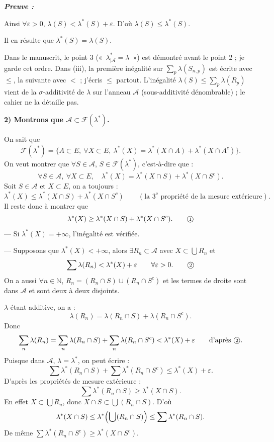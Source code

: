 \documentclass[11pt,a4paper]{article}
\newcommand{\N}{\mathbb{N}}
\newcommand{\A}{\mathscr{A}}
\newcommand{\Ff}{\mathscr{F}}
\newenvironment{preuve}{\par\textit{\textbf{Preuve :}}\par\nopagebreak[4]}{\par}
\begin{document}
\begin{preuve}
Ainsi $\forall\varepsilon>0$, $\lambda(S)<\lambda^*(S)+\varepsilon$. D'où $\lambda(S)\le\lambda^*(S)$.

Il en résulte que $\lambda^*(S)=\lambda(S)$.

\begin{note}
Dans le manuscrit, le point 3 («~$\lambda^*_{|\A}=\lambda$~») est démontré avant le point 2 ; je garde cet ordre.
Dans (iii), la première inégalité sur $\sum_p\lambda(S_{n,p})$ est écrite avec $\le$, la suivante avec $<$ ; j'écris $\le$ partout.
L'inégalité $\lambda(S)\le\sum_p\lambda(R_p)$ vient de la $\sigma$-additivité de $\lambda$ sur l'anneau $\A$ (sous-additivité dénombrable) ; le cahier ne la détaille pas.
\end{note}

\medskip
\textbf{2) Montrons que $\A\subset\Ff(\lambda^*)$.}

On sait que
\[
  \Ff(\lambda^*)=\bigl\{A\subset E,\ \forall X\subset E,\ \lambda^*(X)=\lambda^*(X\cap A)+\lambda^*(X\cap A^c)\bigr\}.
\]
On veut montrer que $\forall S\in\A$, $S\in\Ff(\lambda^*)$, c'est-à-dire que :
\[
  \forall S\in\A,\ \forall X\subset E,\quad \lambda^*(X)=\lambda^*(X\cap S)+\lambda^*(X\cap S^c).
\]
Soit $S\in\A$ et $X\subset E$, on a toujours :
\[
  \lambda^*(X)\le\lambda^*(X\cap S)+\lambda^*(X\cap S^c)\qquad(\text{la }3^{\text{e}}\text{ propriété de la mesure extérieure}).
\]
Il reste donc à montrer que
\begin{equation*}
  \lambda^*(X)\ge\lambda^*(X\cap S)+\lambda^*(X\cap S^c).\tag*{\textcircled{\scriptsize 1}}
\end{equation*}
--- Si $\lambda^*(X)=+\infty$, l'inégalité est vérifiée.

--- Supposons que $\lambda^*(X)<+\infty$, alors $\exists R_n\subset\A$ avec $X\subset\bigcup R_n$ et
\begin{equation*}
  \sum\lambda(R_n)<\lambda^*(X)+\varepsilon\qquad\forall\varepsilon>0 .\tag*{\textcircled{\scriptsize 2}}
\end{equation*}
On a aussi $\forall n\in\N$, $R_n=(R_n\cap S)\cup(R_n\cap S^c)$ et les termes de droite sont dans $\A$ et sont deux à deux disjoints.

$\lambda$ étant additive, on a :
\[
  \lambda(R_n)=\lambda(R_n\cap S)+\lambda(R_n\cap S^c).
\]
Donc
\[
  \sum_n\lambda(R_n)=\sum_n\lambda(R_n\cap S)+\sum_n\lambda(R_n\cap S^c)<\lambda^*(X)+\varepsilon\qquad\text{d'après \textcircled{\scriptsize 2}}.
\]
Puisque dans $\A$, $\lambda=\lambda^*$, on peut écrire :
\[
  \sum\lambda^*(R_n\cap S)+\sum\lambda^*(R_n\cap S^c)\le\lambda^*(X)+\varepsilon .
\]
D'après les propriétés de mesure extérieure :
\[
  \sum\lambda^*(R_n\cap S)\ge\lambda^*(X\cap S).
\]
En effet $X\subset\bigcup R_n$, donc $X\cap S\subset\bigcup(R_n\cap S)$. D'où
\[
  \lambda^*(X\cap S)\le\lambda^*\Bigl(\bigcup(R_n\cap S)\Bigr)\le\sum\lambda^*(R_n\cap S).
\]
De même $\displaystyle\sum\lambda^*(R_n\cap S^c)\ge\lambda^*(X\cap S^c)$.


\end{preuve}
\end{document}
